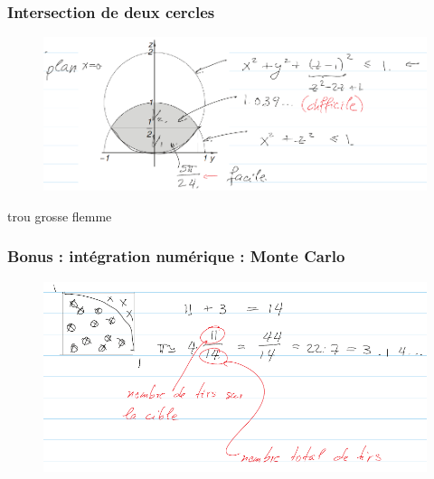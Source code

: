 \documentclass[12pt,a4paper]{article}
\begin{document}
\subsubsection{Intersection de deux cercles}
\begin{figure}[!h]
	\centering
	\includegraphics[scale=0.5]{images/plans}
\end{figure}
{trou grosse flemme}

\subsubsection*{Bonus : intégration numérique : Monte Carlo}
\begin{figure}[!h]
	\centering
	\includegraphics[scale=0.5]{images/monte_carlo}
\end{figure}
\end{document}
